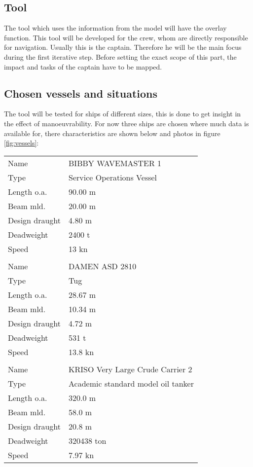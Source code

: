 \subsection{Tool}
The tool which uses the information from the model will have the overlay function. This tool will be developed for the crew, whom are directly responsible for navigation. Usually this is the captain. Therefore he will be the main focus during the first iterative step. Before setting the exact scope of this part, the impact and tasks of the captain have to be mapped.

\newpage
\subsection{Chosen vessels and situations}
The tool will be tested for ships of different sizes, this is done to get insight in the effect of manoeuvrability. For now three ships are chosen where much data is available for, there characteristics are shown below and photos in figure \ref{fig:vessels}:

\begin{tabular}[L]{l l}
	Name			& BIBBY WAVEMASTER 1 \\
	Type			& Service Operations Vessel \\
	Length o.a.		& 90.00 m \\
	Beam mld.		& 20.00 m \\
	Design draught	& 4.80 m \\
	Deadweight		& 2400 t \\
	Speed			& 13 kn \\
	& \\
	Name			& DAMEN ASD 2810 \\
	Type			& Tug \\
	Length o.a.		& 28.67	m \\
	Beam mld.		& 10.34	m \\
	Design draught	& 4.72 m \\
	Deadweight		& 531 t \\
	Speed			& 13.8 kn \\
	& \\
	Name			& KRISO Very Large Crude Carrier 2 \\
	Type			& Academic standard model oil tanker\\
	Length o.a.		& 320.0 m \\
	Beam mld.		& 58.0 m \\
	Design draught	& 20.8 m \\
	Deadweight		& 320438 ton \\
	Speed			& 7.97 kn \\
\end{tabular}


